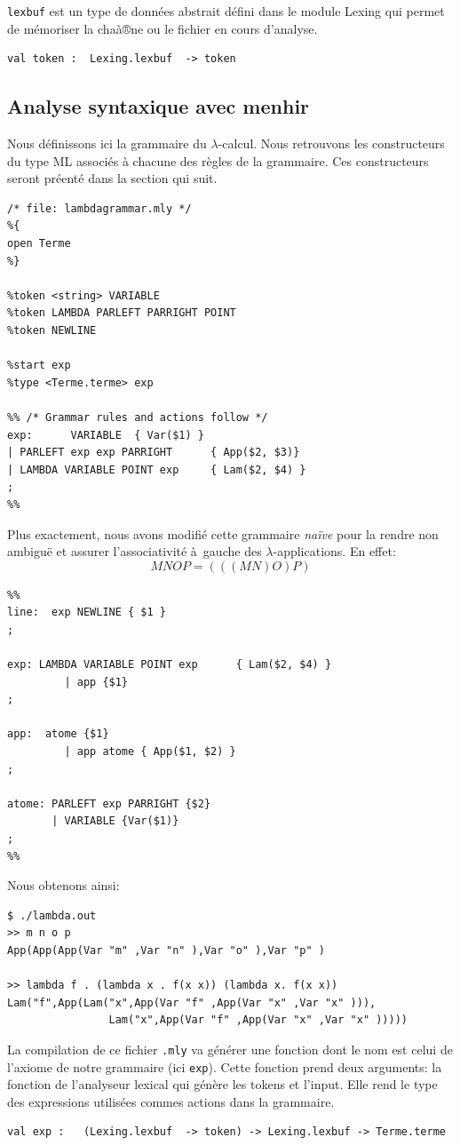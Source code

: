 \documentclass[11pt]{book}
\begin{document}
\verb+lexbuf+  est un type de données abstrait défini dans le module Lexing 
qui permet de mémoriser la chaà®ne ou le fichier en cours d'analyse.
\begin{Verbatim}
val token :  Lexing.lexbuf  -> token 
\end{Verbatim}

\subsection{Analyse syntaxique avec menhir}
Nous d\'{e}finissons ici la grammaire du $\lambda$-calcul.
Nous retrouvons les constructeurs du type ML associ\'{e}s \`{a} chacune des r\`{e}gles de la grammaire.
Ces constructeurs seront préenté dans la section qui suit.


\begin{Verbatim}
/* file: lambdagrammar.mly */
%{
open Terme
%}

%token <string> VARIABLE
%token LAMBDA PARLEFT PARRIGHT POINT
%token NEWLINE

%start exp
%type <Terme.terme> exp

%% /* Grammar rules and actions follow */
exp:      VARIABLE	{ Var($1) }
| PARLEFT exp exp PARRIGHT		{ App($2, $3)}
| LAMBDA VARIABLE POINT exp		{ Lam($2, $4) }
;
%%
\end{Verbatim}



Plus exactement, nous avons modifié cette grammaire \textit{naïve} pour la
rendre non ambiguë et assurer l'associativité à gauche des
$\lambda$-applications.
En effet: 
$$ M N O P = (((M N) O) P) $$
\begin{Verbatim}
%% 
line:  exp NEWLINE { $1 }
;

exp: LAMBDA VARIABLE POINT exp		{ Lam($2, $4) }
		 | app {$1}
;

app:  atome {$1}
		 | app atome { App($1, $2) }
;

atome: PARLEFT exp PARRIGHT {$2}
       | VARIABLE {Var($1)}
;		
%%
\end{Verbatim}
Nous obtenons ainsi:
\begin{Verbatim}
$ ./lambda.out
>> m n o p
App(App(App(Var "m" ,Var "n" ),Var "o" ),Var "p" )

>> lambda f . (lambda x . f(x x)) (lambda x. f(x x))
Lam("f",App(Lam("x",App(Var "f" ,App(Var "x" ,Var "x" ))),
				Lam("x",App(Var "f" ,App(Var "x" ,Var "x" )))))
\end{Verbatim}



La compilation de ce fichier \verb+.mly+ va générer une fonction dont le nom
est celui de l'axiome de notre grammaire (ici \verb+exp+). Cette fonction prend deux arguments: la fonction de l'analyseur lexical qui génère les tokens et l'input. Elle rend le type
des expressions utilisées commes actions dans la grammaire.
\begin{Verbatim}
val exp :   (Lexing.lexbuf  -> token) -> Lexing.lexbuf -> Terme.terme
\end{Verbatim}
\end{document}
